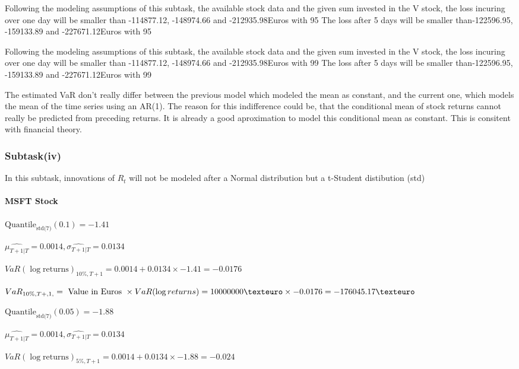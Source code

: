 Following the modeling assumptions of this subtask, the available stock data and the given sum invested in the V stock, the loss incuring over one day will be smaller than -114877.12, -148974.66 and -212935.98Euros with 95%
The loss after 5 days will be smaller than-122596.95, -159133.89 and -227671.12Euros with 95%



Following the modeling assumptions of this subtask, the available stock data and the given sum invested in the V stock, the loss incuring over one day will be smaller than -114877.12, -148974.66 and -212935.98Euros with 99%
The loss after 5 days will be smaller than-122596.95, -159133.89 and -227671.12Euros with 99%

The estimated VaR don't really differ between the previous model which modeled the mean as constant, and the current one, which models the mean of the time series using an AR(1). 
The reason for this indifference could be, that the conditional mean of stock returns cannot really be predicted from preceding returns. It is already a good aproximation to model this conditional mean as constant. This is consitent with financial theory.

\subsubsection{Subtask(iv)}
In this subtask, innovations of $R_t$ will not be modeled after a Normal distribution but a t-Student distibution (std) 

\paragraph{MSFT Stock}


$\text{Quantile}_\text{std(7)}(0.1) = -1.41$

$\hat{\mu_{T+1|T}} = 0.0014, \hat{\sigma_{T+1|T}} = 0.0134$

$VaR(\log \text{returns})_{10\%, T + 1} = 0.0014 + 0.0134\times-1.41 = -0.0176$

$VaR_{10\%, T + ,1,} = \text{ Value in Euros } \times VaR(\log returns) = 10 000 000 \texteuro \times-0.0176 = -176045.17 \texteuro$


$\text{Quantile}_\text{std(7)}(0.05) = -1.88$

$\hat{\mu_{T+1|T}} = 0.0014, \hat{\sigma_{T+1|T}} = 0.0134$

$VaR(\log \text{returns})_{5\%, T + 1} = 0.0014 + 0.0134\times-1.88 = -0.024$

